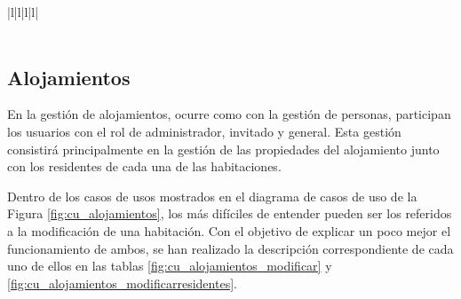 \begin{table}[h!]
{\begin{tabular}{|l|l|l|l|}
        \hline
                                                                                                                                                                                                                            \\ 
        \hline
            \\
        \hline
        \end{tabular}
    }
    \caption{Curso de eventos del caso de uso 3}
\end{table}

\newpage

\subsection{Alojamientos}

En la gestión de alojamientos, ocurre como con la gestión de personas, participan los usuarios con el rol de administrador, invitado y general. Esta gestión consistirá principalmente en la gestión de las propiedades del alojamiento junto con los residentes de cada una de las habitaciones. 

Dentro de los casos de usos mostrados en el diagrama de casos de uso de la Figura \ref{fig:cu_alojamientos}, los más difíciles de entender pueden ser los referidos a la modificación de una habitación. Con el objetivo de explicar un poco mejor el funcionamiento de ambos, se han realizado la descripción correspondiente de cada uno de ellos en las tablas \ref{fig:cu_alojamientos_modificar} y \ref{fig:cu_alojamientos_modificarresidentes}. 

